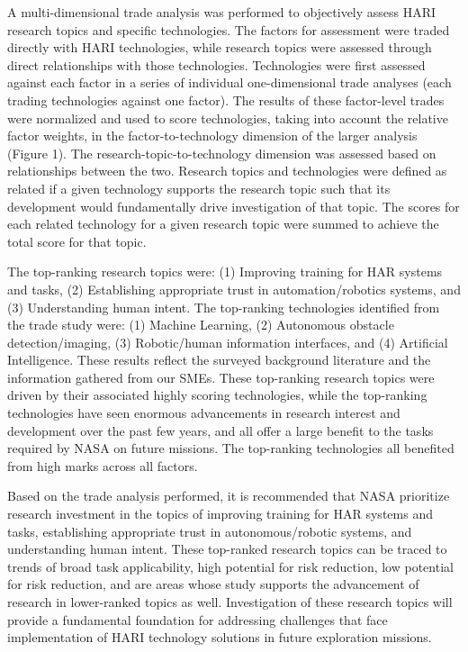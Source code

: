 A multi-dimensional trade analysis was performed to objectively assess HARI research topics and specific technologies.
The factors for assessment were traded directly with HARI technologies, while research topics were assessed through direct relationships with those technologies.
Technologies were first assessed against each factor in a series of individual one-dimensional trade analyses (each trading technologies against one factor).
The results of these factor-level trades were normalized and used to score technologies, taking into account the relative factor weights, in the factor-to-technology dimension of the larger analysis (Figure 1).
The research-topic-to-technology dimension was assessed based on relationships between the two.
Research topics and technologies were defined as related if a given technology supports the research topic such that its development would fundamentally drive investigation of that topic.
The scores for each related technology for a given research topic were summed to achieve the total score for that topic.

The top-ranking research topics were: (1) Improving training for HAR systems and tasks, (2) Establishing appropriate trust in automation/robotics systems, and (3) Understanding human intent.
The top-ranking technologies identified from the trade study were: (1) Machine Learning, (2) Autonomous obstacle detection/imaging, (3) Robotic/human information interfaces, and (4) Artificial Intelligence.
These results reflect the surveyed background literature and the information gathered from our SMEs.
These top-ranking research topics were driven by their associated highly scoring technologies, while the top-ranking technologies have seen enormous advancements in research interest and development over the past few years, and all offer a large benefit to the tasks required by NASA on future missions.
The top-ranking technologies all benefited from high marks across all factors.

Based on the trade analysis performed, it is recommended that NASA prioritize research investment in the topics of improving training for HAR systems and tasks, establishing appropriate trust in autonomous/robotic systems, and understanding human intent.
These top-ranked research topics can be traced to trends of broad task applicability, high potential for risk reduction, low potential for risk reduction, and are areas whose study supports the advancement of research in lower-ranked topics as well.
Investigation of these research topics will provide a fundamental foundation for addressing challenges that face implementation of HARI technology solutions in future exploration missions.

